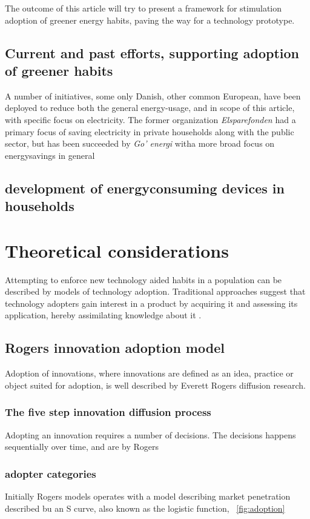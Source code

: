 \documentclass[journal]{IEEEtran}
\begin{document}
The outcome of this article will try to present a framework for stimulation adoption of greener energy habits, paving the way for a technology prototype.

\subsection{Current and past efforts, supporting adoption of greener habits}
A number of initiatives, some only Danish, other common European, have been deployed to reduce both the general energy-usage, and in scope of this article, with specific focus on electricity. The former organization \textit{Elsparefonden} had a primary focus of saving electricity in private households along with the public sector, but has been succeeded by \textit{Go' energi} witha more broad focus on energysavings in general \cite{ing_elspar} 

\subsection{development of energyconsuming devices in households}

\section{Theoretical considerations}
Attempting to enforce new technology aided habits in a population can be described by models of technology adoption. 
Traditional approaches suggest that technology adopters gain interest in a product by acquiring it and assessing its application, hereby assimilating knowledge about it \cite{gilbert}.

\subsection{Rogers innovation adoption model}
Adoption of innovations, where innovations are defined as an idea, practice or object suited for adoption, is well described by Everett Rogers diffusion research.

\subsubsection{The five step innovation diffusion process}
Adopting an innovation requires a number of decisions. The decisions happens sequentially over time, and are by Rogers \cite{rogers_model}

\subsubsection{adopter categories}
Initially Rogers models \cite{rogers_model} operates with a model describing market penetration described bu an S curve, also known as the logistic function, ~\ref{fig:adoption}
\end{document}
